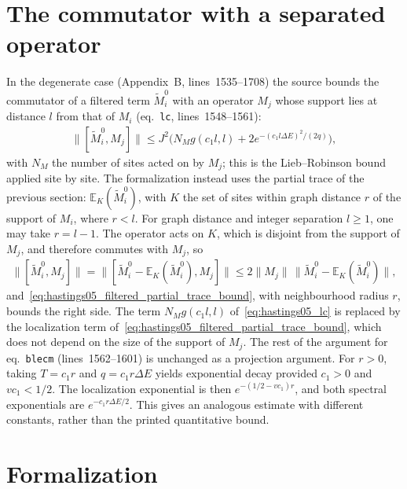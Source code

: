 \documentclass{article}
\begin{document}
\section{The commutator with a separated operator}

In the degenerate case (Appendix~B, lines~1535--1708) the source bounds the
commutator of a filtered term $\tilde M_i^0$ with an operator $M_j$ whose
support lies at distance $l$ from that of $M_i$ (eq.~\texttt{lc},
lines~1548--1561):
\begin{align}
  \lVert[\tilde M_i^0,M_j]\rVert\le
  J^2\bigl(N_Mg(c_1l,l)+2e^{-(c_1l\Delta E)^2/(2q)}\bigr),
  \label{eq:hastings05_lc}
\end{align}
with $N_M$ the number of sites acted on by $M_j$; this is the Lieb--Robinson
bound applied site by site. The formalization instead uses the partial trace of
the previous section: $\mathbb E_K(\tilde M_i^0)$, with $K$ the set of sites
within graph distance $r$ of the support of $M_i$, where $r<l$. For graph
distance and integer separation $l\ge1$, one may take $r=l-1$. The operator
acts on $K$, which is disjoint from the support of $M_j$, and therefore
commutes with $M_j$, so
\begin{align}
  \lVert[\tilde M_i^0,M_j]\rVert
  =\lVert[\tilde M_i^0-\mathbb E_K(\tilde M_i^0),M_j]\rVert
  \le2\lVert M_j\rVert\,\lVert\tilde M_i^0-\mathbb E_K(\tilde M_i^0)\rVert,
  \label{eq:hastings05_lc_partial_trace}
\end{align}
and~\eqref{eq:hastings05_filtered_partial_trace_bound}, with neighbourhood radius $r$, bounds the right side. The term $N_Mg(c_1l,l)$
of~\eqref{eq:hastings05_lc} is replaced by the localization term
of~\eqref{eq:hastings05_filtered_partial_trace_bound}, which does not depend on the size of the support of
$M_j$. The rest of the argument for eq.~\texttt{blecm} (lines~1562--1601) is
unchanged as a projection argument. For $r>0$, taking $T=c_1r$ and
$q=c_1r\Delta E$ yields exponential decay provided $c_1>0$ and
$vc_1<1/2$. The localization exponential is then
$e^{-(1/2-vc_1)r}$, and both spectral exponentials are
$e^{-c_1r\Delta E/2}$. This gives an analogous estimate with different
constants, rather than the printed quantitative bound.

\section{Formalization}
\end{document}
